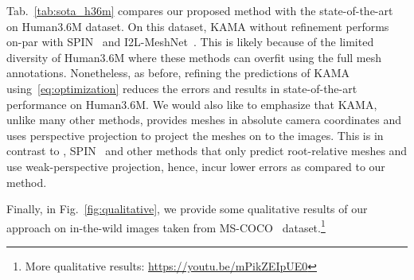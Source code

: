 Tab.~\ref{tab:sota_h36m} compares our proposed method with the state-of-the-art on Human3.6M dataset. On this dataset, KAMA without refinement performs on-par with SPIN~\cite{kolotouros2019spin} and I2L-MeshNet~\cite{moon2020i2l}. This is likely because of the limited diversity of Human3.6M where these methods can overfit using the full mesh annotations. Nonetheless, as before, refining the predictions of KAMA using~\eqref{eq:optimization} reduces the errors and results in state-of-the-art performance on Human3.6M. We would also like to emphasize that KAMA, unlike many other methods, provides meshes in absolute camera coordinates and uses perspective projection to project the meshes on to the images. This is in contrast to \eg, SPIN~\cite{kolotouros2019spin} and other methods that only predict root-relative meshes and use weak-perspective projection, hence, incur lower errors as compared to our method. 

Finally, in Fig.~\ref{fig:qualitative}, we provide some qualitative results of our approach on  in-the-wild images taken from MS-COCO~\cite{lin2014microsoft} dataset.\footnote{More qualitative results: \url{https://youtu.be/mPikZEIpUE0}}
